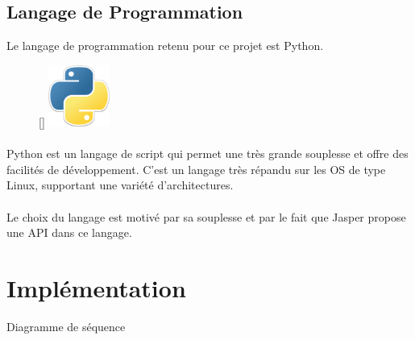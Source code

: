 \documentclass[12pt]{article}
\begin{document}
        \subsection{Langage de Programmation}

        Le langage de programmation retenu pour ce projet est Python.
                \begin{figure}
                	\centering
                	\raisebox{0pt}[\dimexpr{}\baselineskip\relax]{%
                        \includegraphics[width=2cm]{logo-python}%
                    }
                	\caption[Logo de Python]{}
                \end{figure}

        \paragraph{}
        Python est un langage de script qui permet une très grande souplesse et
        offre des facilités de développement. C'est un langage très répandu sur
        les OS de type Linux, supportant une variété d'architectures.

        \paragraph{}
        Le choix du langage est motivé par sa souplesse et par le fait que
        Jasper propose une API dans ce langage.

	\section{Implémentation}
		Diagramme de séquence
\end{document}
